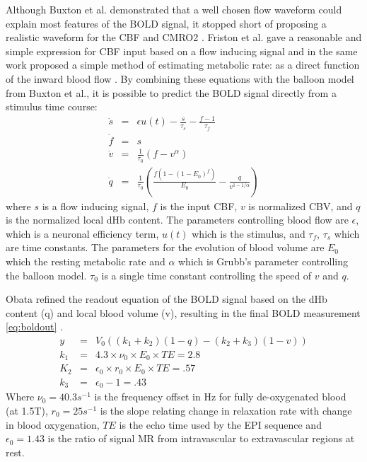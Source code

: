 \documentclass{article}
\begin{document}
Although Buxton et al. demonstrated that a well chosen flow waveform could 
explain most features of the \ac{BOLD} signal, it stopped short of proposing a
realistic waveform for the \ac{CBF} and \ac{CMRO2} \cite{Buxton1998}. Friston et al. 
gave a reasonable and simple
expression for \ac{CBF} input based on a flow inducing signal
and in the same work proposed a simple method
of estimating metabolic rate: as a direct function of the inward blood flow \cite{Friston2000}.
By combining these equations with the balloon model from Buxton et al.,
it is possible to predict the \ac{BOLD} signal directly from a stimulus time course:
\begin{eqnarray}
\label{eq:bold1}
\dot{s} &=& \epsilon u(t) - \frac{s}{\tau_s} - \frac{f - 1}{\tau_f} \\
\label{eq:bold2}
\dot{f} &=& s\\
\label{eq:bold3}
\dot{v} &=& \frac{1}{\tau_0}(f - v^\alpha)\\
\label{eq:bold4}
\dot{q} &=& \frac{1}{\tau_0}(\frac{f(1-(1-E_0)^f)}{E_0} - \frac{q}{v^{1-1/\alpha}})
\end{eqnarray}
where $s$ is a flow inducing signal, $f$ is the input \ac{CBF},
$v$ is normalized \ac{CBV}, and $q$ is the normalized
local \ac{dHb} content. The 
parameters controlling blood flow are $\epsilon$, which is a neuronal 
efficiency term, $u(t)$ which is the stimulus, and $\tau_f$, $\tau_s$ 
which are time constants. The parameters for the evolution of blood 
volume are $E_0$ which the resting metabolic
rate and $\alpha$ which is Grubb's parameter controlling the balloon model. 
$\tau_0$ is a single time constant controlling the speed of $v$ and $q$.

Obata refined the readout equation 
of the \ac{BOLD} signal based on the
\ac{dHb} content (q) and local blood volume (v), resulting in the
final \ac{BOLD} measurement \autoref{eq:boldout} \cite{Obata2004}.
\begin{eqnarray}
\label{eq:boldout}
y   &=& V_0((k_1 + k_2)(1-q) - (k_2 + k_3)(1-v))\\
k_1 &=& 4.3 \times \nu_0 \times E_0 \times TE = 2.8 \nonumber\\
K_2 &=& \epsilon_0 \times r_0 \times E_0 \times TE = .57 \nonumber \\
k_3 &=& \epsilon_0 - 1 = .43 \nonumber
\end{eqnarray}
Where $\nu_0 = 40.3 s^{-1}$  is the frequency offset in Hz for fully
de-oxygenated blood (at 1.5T), $r_0 = 25 s^{-1}$  is the slope relating
change in relaxation rate with change in blood oxygenation, $TE$ is the
echo time used by the \ac{EPI} sequence and $\epsilon_0 = 1.43$ is the 
ratio of signal \ac{MR} from intravascular to extravascular regions at rest. 
\end{document}
